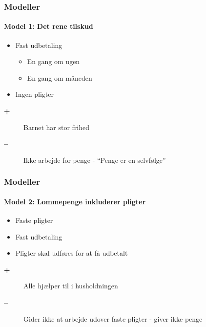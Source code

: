 
\newcommand{\fordel}[1]{ %
\begin{description}\item[\color{ForestGreen}\textbf{+}]{#1}\end{description}
}

\newcommand{\ulempe}[1]{ %
\begin{description}\item[\color{red}\textbf{--}]{#1}\end{description}
}

\newcommand{\headercell}[1]{ %
\cellcolor{aauprimary}\color{white}\small\textbf{{#1}}
}

\begin{frame}
\frametitle{Modeller}
\framesubtitle{\textbf{Model 1:} Det rene tilskud} 
    \begin{itemize}
        \item{Fast udbetaling}
            \begin{itemize}
                \item{En gang om ugen}
                \item{En gang om måneden}
            \end{itemize}
        \item{Ingen pligter} 
    \end{itemize}
    \vspace{\baselineskip}
    \pause
    \fordel{Barnet har stor frihed}
    \ulempe{Ikke arbejde for penge - ``Penge er en selvfølge''}
\end{frame}

\begin{frame}
\frametitle{Modeller}
\framesubtitle{\textbf{Model 2:} Lommepenge inkluderer pligter}
    \begin{itemize}
        \item{Faste pligter}
        \item{Fast udbetaling}
        \item{Pligter skal udføres for at få udbetalt}
    \end{itemize}
    \vspace{\baselineskip}
    \pause
    \fordel{Alle hjælper til i husholdningen}
    \ulempe{Gider ikke at arbejde udover faste pligter - giver ikke penge}
\end{frame}

